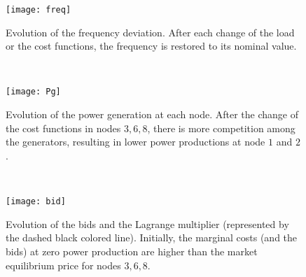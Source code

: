 \documentclass[journal]{IEEEtran}
\newcommand{\1}{\mathds 1}
\theoremstyle{remark}
\theoremstyle{definition}
\begin{document}
\begin{figure*}[tbh]
  \centering
  \begin{subfigure}[t]{0.3\textwidth}
    \texttt{[image: freq]}
    \caption{Evolution of the frequency deviation. After each
      change of the load or the cost functions, the frequency is
      restored to its nominal value.}
    \label{fig:freq}
  \end{subfigure}
  ~ %
  \begin{subfigure}[t]{0.3\textwidth}
    \texttt{[image: Pg]}
    \caption{Evolution of the power generation at each node. After the change
      of the cost functions in nodes $3,6,8$, there is more
      competition among the generators, resulting in lower power
      productions at node $1$ and $2$.}
    \label{fig:Pg}
  \end{subfigure}
  ~ %
  \begin{subfigure}[t]{0.3\textwidth}
    \texttt{[image: bid]}
    \caption{Evolution of the bids and the Lagrange multiplier
      (represented by the dashed black colored line). Initially,
      the marginal costs (and the bids) at zero power production
      are higher than the market equilibrium price for nodes
      $3,6,8$.}
    \label{fig:bids}
  \end{subfigure}
  \caption{Simulations of the interconnection~\eqref{eq:cl-sys}
    between the ISO-generation bidding mechanism and the power network
    dynamics with $\sigma=300$.  At $t=\SI{1}{\second}$ the load at
    node $3$ is increased from \SI{80}{\mega\watt} to
    \SI{94.2}{\mega\watt}. At $t=\SI{15}{\second}$ the marginal cost
    decreases at nodes $3,6,8$ which allows these generators to make
    profit by lowering their bids to have a positive power production
    as illustrated in plots (b) and (c). }\label{fig:proj-sys}
\end{figure*}
\end{document}
